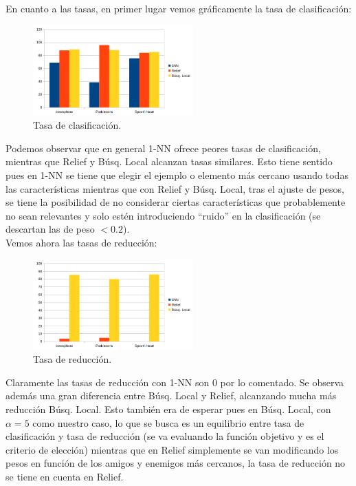 \documentclass[11pt,a4paper]{article}
\theoremstyle{definition}
\begin{document}
	
	En cuanto a las tasas, en primer lugar vemos gráficamente la tasa de clasificación:
	
	\begin{figure}[H]
		\centering
		\includegraphics[width=0.55\textwidth]{images/tasa_clas.png}
		\caption{Tasa de clasificación.}
	\end{figure}
	
	Podemos observar que en general 1-NN ofrece peores tasas de clasificación, mientras que Relief y Búsq. Local alcanzan tasas similares. Esto tiene sentido pues en 1-NN se tiene que elegir el ejemplo o elemento más cercano usando todas las características mientras que con Relief y Búsq. Local, tras el ajuste de pesos, se tiene la posibilidad de no considerar ciertas características que probablemente no sean relevantes y solo estén introduciendo ``ruido'' en la clasificación (se descartan las de peso $< 0.2$).\\
	
	Vemos ahora las tasas de reducción:
	\begin{figure}[H]
		\centering
		\includegraphics[width=0.55\textwidth]{images/tasa_red.png}
		\caption{Tasa de reducción.}
	\end{figure}
	
	Claramente las tasas de reducción con 1-NN son 0 por lo comentado. Se observa además una gran diferencia entre Búsq. Local y Relief, alcanzando mucha más reducción Búsq. Local. Esto también era de esperar pues en Búsq. Local, con $\alpha=5$ como nuestro caso, lo que se busca es un equilibrio entre tasa de clasificación y tasa de reducción (se va evaluando la función objetivo y es el criterio de elección) mientras que en Relief simplemente se van modificando los pesos en función de los amigos y enemigos más cercanos, la tasa de reducción no se tiene en cuenta en Relief.\\
	
\end{document}
